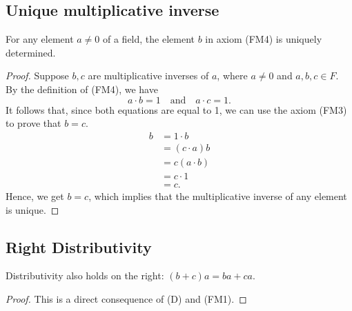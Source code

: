 \documentclass[11pt]{article}
\begin{document}
    \subsection{Unique multiplicative inverse}
    For any element \(a \neq 0\) of a field, the element $b$ in axiom (FM4) is uniquely determined.
    \begin{proof}
        Suppose $b,c$ are multiplicative inverses of $a$, where \(a \neq 0\) and \(a,b,c \in F\). By the definition of (FM4), we have \[a \cdot b = 1 \quad \text{and} \quad a \cdot c = 1.\] It follows that, since both equations are equal to 1, we can use the axiom (FM3) to prove that \(b = c.\)
        \begin{align*}
            b &= 1 \cdot b     \\
              &= (c \cdot a) b \\
              &= c(a \cdot b)  \\
              &= c \cdot 1     \\
              &= c.
        \end{align*}
        Hence, we get \(b = c\), which implies that the multiplicative inverse of any element is unique.
    \end{proof}

    \subsection{Right Distributivity}

    Distributivity also holds on the right: \((b+c)a = ba + ca.\)
    \begin{proof}
        This is a direct consequence of (D) and (FM1).
    \end{proof}
\end{document}

